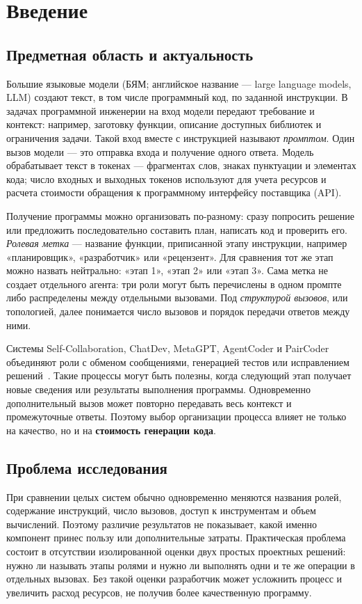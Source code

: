 \FloatBarrier
\section{Введение}\label{sec:intro}
\subsection{Предметная область и актуальность}
Большие языковые модели (БЯМ; английское название --- large language models, LLM) создают текст, в том числе программный код, по заданной инструкции. В задачах программной инженерии на вход модели передают требование и контекст: например, заготовку функции, описание доступных библиотек и ограничения задачи. Такой вход вместе с инструкцией называют \emph{промптом}. Один вызов модели --- это отправка входа и получение одного ответа. Модель обрабатывает текст в токенах --- фрагментах слов, знаках пунктуации и элементах кода; число входных и выходных токенов используют для учета ресурсов и расчета стоимости обращения к программному интерфейсу поставщика (API).

Получение программы можно организовать по-разному: сразу попросить решение или предложить последовательно составить план, написать код и проверить его. \emph{Ролевая метка} --- название функции, приписанной этапу инструкции, например «планировщик», «разработчик» или «рецензент». Для сравнения тот же этап можно назвать нейтрально: «этап 1», «этап 2» или «этап 3». Сама метка не создает отдельного агента: три роли могут быть перечислены в одном промпте либо распределены между отдельными вызовами. Под \emph{структурой вызовов}, или топологией, далее понимается число вызовов и порядок передачи ответов между ними.

Системы Self-Collaboration, ChatDev, MetaGPT, AgentCoder и PairCoder объединяют роли с обменом сообщениями, генерацией тестов или исправлением решений~\cite{dong2023selfcollaboration,qian2024chatdev,hong2024metagpt,huang2023agentcoder,zhang2024paircoder}. Такие процессы могут быть полезны, когда следующий этап получает новые сведения или результаты выполнения программы. Одновременно дополнительный вызов может повторно передавать весь контекст и промежуточные ответы. Поэтому выбор организации процесса влияет не только на качество, но и на \textbf{стоимость генерации кода}.

\subsection{Проблема исследования}
При сравнении целых систем обычно одновременно меняются названия ролей, содержание инструкций, число вызовов, доступ к инструментам и объем вычислений. Поэтому различие результатов не показывает, какой именно компонент принес пользу или дополнительные затраты. Практическая проблема состоит в отсутствии изолированной оценки двух простых проектных решений: нужно ли называть этапы ролями и нужно ли выполнять одни и те же операции в отдельных вызовах. Без такой оценки разработчик может усложнить процесс и увеличить расход ресурсов, не получив более качественную программу.

